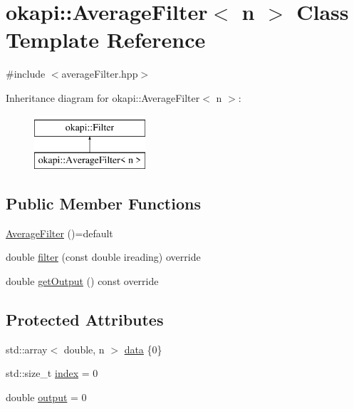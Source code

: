 \hypertarget{classokapi_1_1AverageFilter}{}\section{okapi\+::Average\+Filter$<$ n $>$ Class Template Reference}
\label{classokapi_1_1AverageFilter}


{\ttfamily \#include $<$average\+Filter.\+hpp$>$}

Inheritance diagram for okapi\+::Average\+Filter$<$ n $>$\+:\begin{figure}[H]
\begin{center}
\leavevmode
\includegraphics[height=2.000000cm]{classokapi_1_1AverageFilter}
\end{center}
\end{figure}
\subsection*{Public Member Functions}
\begin{DoxyCompactItemize}
\item 
\mbox{\hyperlink{classokapi_1_1AverageFilter_a21483cccbe9d9aa49200c3b4b6d8a878}{Average\+Filter}} ()=default
\item 
double \mbox{\hyperlink{classokapi_1_1AverageFilter_a6030d718df73a9a1d7a99c104c3e564e}{filter}} (const double ireading) override
\item 
double \mbox{\hyperlink{classokapi_1_1AverageFilter_a2ee104dfc880e779079dc8e1e242a44b}{get\+Output}} () const override
\end{DoxyCompactItemize}
\subsection*{Protected Attributes}
\begin{DoxyCompactItemize}
\item 
std\+::array$<$ double, n $>$ \mbox{\hyperlink{classokapi_1_1AverageFilter_a1aeb97bb7bda056a072281c974b074be}{data}} \{0\}
\item 
std\+::size\+\_\+t \mbox{\hyperlink{classokapi_1_1AverageFilter_ab551add0adf7ec09120e73e3f83af411}{index}} = 0
\item 
double \mbox{\hyperlink{classokapi_1_1AverageFilter_ad01d62f539475ad62ca73bb92aa3968d}{output}} = 0
\end{DoxyCompactItemize}


